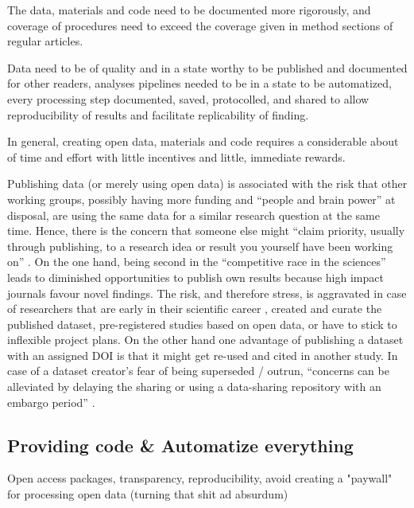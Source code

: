 The data, materials and code need to be documented more rigorously, and coverage
of procedures need to exceed the coverage given in method sections of regular
articles.

Data need to be of quality and in a state worthy to be published and documented
for other readers, analyses pipelines needed to be in a state to be automatized,
every processing step documented, saved, protocolled, and shared to allow
reproducibility of results and facilitate replicability of finding.


In general, creating open data, materials and code requires a considerable about
of time and effort with little incentives and little, immediate rewards.


%
Publishing data (or merely using open data) is associated with the risk that
other working groups, possibly having more funding and ``people and brain
power'' at disposal, are using the same data for a similar research question at
the same time.
%
Hence, there is the concern that someone else might ``claim priority, usually
through publishing, to a research idea or result you yourself have been working
on'' \citep{laine2017afraid}.
%
On the one hand, being second in the ``competitive race in the sciences'' leads
to diminished opportunities to publish own results because high impact journals
favour novel findings.
%
The risk, and therefore stress, is aggravated in case of researchers that are
early in their scientific career \citep[cf.][]{toribio2021early}, created and
curate the published dataset, pre-registered studies based on open data, or have
to stick to inflexible project plans.
%
On the other hand one advantage of publishing a dataset with an assigned DOI is
that it might get re-used and cited in another study.
%
In case of a dataset creator's fear of being superseded / outrun, ``concerns can
be alleviated by delaying the sharing or using a data-sharing repository with an
embargo period'' \citep{nichols2017best}.



\subsection{Providing code \& Automatize everything}


Open access packages, transparency, reproducibility, avoid creating a "paywall"
for processing open data (turning that shit ad absurdum)



